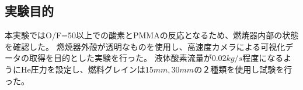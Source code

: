 \subsection{実験目的}
本実験ではO/F=50以上での酸素とPMMAの反応となるため、燃焼器内部の状態を確認した。
燃焼器外殻が透明なものを使用し、高速度カメラによる可視化データの取得を目的とした実験を行った。
液体酸素流量が$0.02kg/s$程度になるようにHe圧力を設定し、燃料グレインは$15mm,30mm$の２種類を使用し試験を行った。


